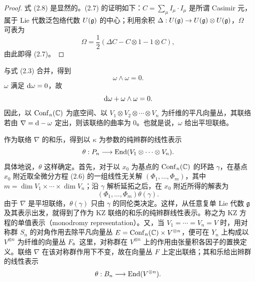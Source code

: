 
\begin{proof}
  式 (2.8) 是显然的。(2.7) 的证明如下：$C=\sum_\mu I_\mu\cdot I_\mu$ 是所谓 Casimir 元，属于 Lie 代数泛包络代数 $U(\mathfrak{g})$ 的中心；利用余积 $\Delta:U(\mathfrak{g})\to U(\mathfrak{g})\otimes U(\mathfrak{g})$，$\Omega$ 可表为
  \[
    \Omega=\frac{1}{2}\left(\Delta C-C\otimes 1-1\otimes C\right),
  \]
  由此即得 (2.7)。
\end{proof}

与式 (2.3) 合并，得到
\begin{equation}
  \omega\wedge\omega=0. \tag{2.9}
\end{equation}
$\omega$ 满足 $\mathrm{d}\omega=0$，故
\[
  \mathrm{d}\omega+\omega\wedge\omega=0.
\]
因此，以 $\operatorname{Conf}_n(\mathbb{C})$ 为底空间、以 $V_1\otimes V_2\otimes\cdots\otimes V_n$ 为纤维的平凡向量丛，其联络若由 $\nabla=\mathrm{d}-\omega$ 定出，则该联络的曲率为 $0$。也就是说，$\omega$ 给出平坦联络。


作为联络 $\nabla$ 的和乐，得到以 $\kappa$ 为参数的纯辫群的线性表示
\[
  \theta:P_n\longrightarrow\operatorname{End}(V_1\otimes\cdots\otimes V_n).
\]
具体地说，$\theta$ 这样确定。首先，对于以 $x_0$ 为基点的 $\operatorname{Conf}_n(\mathbb{C})$ 的环路 $\gamma$，在基点 $x_0$ 附近取全微分方程 (2.6) 的一组线性无关解 $(\Phi_1,\dots,\Phi_m)$，其中 $m=\dim V_1\times\cdots\times\dim V_n$；沿 $\gamma$ 解析延拓之后，在 $x_0$ 附近所得的解表为
\[
  (\Phi_1,\dots,\Phi_m)\theta(\gamma).
\]
由于 $\nabla$ 是平坦联络，$\theta(\gamma)$ 只由 $\gamma$ 的同伦类决定。这样，从任意复单 Lie 代数 $\mathfrak{g}$ 及其表示出发，就得到了作为 KZ 联络的和乐的纯辫群线性表示。称之为 KZ 方程的单值表示（monodromy representation）。又，当 $V_1=\cdots=V_n=V$ 时，用对称群 $S_n$ 的对角作用去除平凡向量丛 $E=\operatorname{Conf}_n(\mathbb{C})\times V^{\otimes n}$，便可在 $Y_n$ 上构成以 $V^{\otimes n}$ 为纤维的向量丛 $F$。这里，对称群在 $V^{\otimes n}$ 上的作用由张量积各因子的置换定义。联络 $\nabla$ 在该对称群作用下不变，故在向量丛 $F$ 上定出联络；其和乐给出辫群的线性表示
\[
  \theta:B_n\longrightarrow\operatorname{End}(V^{\otimes n}).
\]


